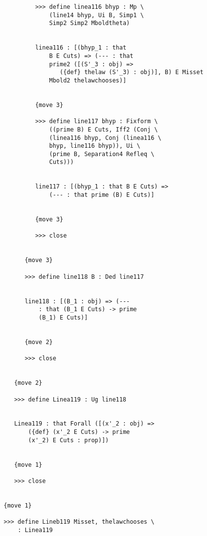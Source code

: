 \documentclass[12pt]{article}
\begin{document}
\begin{verbatim}
            >>> define linea116 bhyp : Mp \
                (line14 bhyp, Ui B, Simp1 \
                Simp2 Simp2 Mboldtheta)


            linea116 : [(bhyp_1 : that 
                B E Cuts) => (--- : that 
                prime2 ([(S'_3 : obj) => 
                   ({def} thelaw (S'_3) : obj)], B) E Misset 
                Mbold2 thelawchooses)]


            {move 3}

            >>> define line117 bhyp : Fixform \
                ((prime B) E Cuts, Iff2 (Conj \
                (linea116 bhyp, Conj (linea116 \
                bhyp, line116 bhyp)), Ui \
                (prime B, Separation4 Refleq \
                Cuts)))


            line117 : [(bhyp_1 : that B E Cuts) => 
                (--- : that prime (B) E Cuts)]


            {move 3}

            >>> close


         {move 3}

         >>> define line118 B : Ded line117


         line118 : [(B_1 : obj) => (--- 
             : that (B_1 E Cuts) -> prime 
             (B_1) E Cuts)]


         {move 2}

         >>> close


      {move 2}

      >>> define Linea119 : Ug line118


      Linea119 : that Forall ([(x'_2 : obj) => 
          ({def} (x'_2 E Cuts) -> prime 
          (x'_2) E Cuts : prop)])


      {move 1}

      >>> close


   {move 1}

   >>> define Lineb119 Misset, thelawchooses \
       : Linea119



\end{verbatim}
\end{document}
